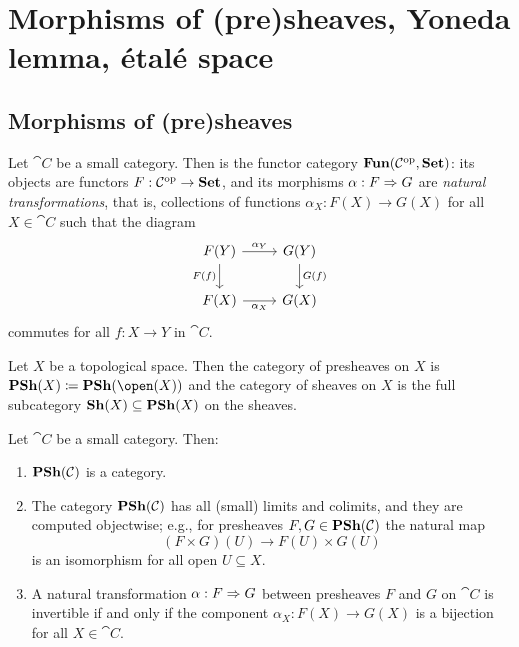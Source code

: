 \chapter{Morphisms of (pre)sheaves, Yoneda lemma, étalé space}


\section{Morphisms of (pre)sheaves}

\begin{defn}
Let $\cat C$ be a small category.
Then  is the functor category $\operatorname{\mathbf{Fun}}(\mathcal{C}^{\mathrm{op}},\mathbf{Set})$: its objects are functors $F\colon\cat C\opp\to\catSet$, and its morphisms $\alpha\colon F\To G$ are \emph{natural transformations}, that is, collections of functions $\alpha_X\colon F(X)\to G(X)$ for all $X\in\cat C$ such that the diagram
\begin{equation*}
    \begin{tikzcd}
        F(Y) \ar[r, "\alpha_Y"] \ar[d, "F(f)"'] & G(Y) \ar[d, "G(f)"] \\
        F(X) \ar[r, "\alpha_X"'] & G(X)
    \end{tikzcd}
\end{equation*}
commutes for all $f\colon X\to Y$ in $\cat C$.
\end{defn}

\begin{defn}
Let $X$ be a topological space.
Then the category of presheaves on $X$ is $\catPresheaf(X)\coloneqq\catPresheaf(\open(X))$ and the category of sheaves on $X$ is the full subcategory $\operatorname{\mathbf{Sh}}(X)\subseteq\operatorname{\mathbf{PSh}}(X)$ on the sheaves.
\end{defn}

\begin{lem}\label{lem:psh-category-set}
Let $\cat C$ be a small category.
Then:
\begin{enumerate}
\item $\operatorname{\mathbf{PSh}}(\mathcal{C})$ is a category.
\item The category $\operatorname{\mathbf{PSh}}(\mathcal{C})$ has all (small) limits and colimits, and they are computed objectwise; e.g., for presheaves $F,G\in\operatorname{\mathbf{PSh}}(\mathcal{C})$ the natural map
    \[ (F\times G)(U) \to F(U)\times G(U) \]
    is an isomorphism for all open $U\subseteq X$.
\item A natural transformation $\alpha\colon F\To G$ between presheaves $F$ and $G$ on $\cat C$ is invertible if and only if the component $\alpha_X\colon F(X)\to G(X)$ is a bijection for all $X\in\cat C$.
\end{enumerate}
\end{lem}

